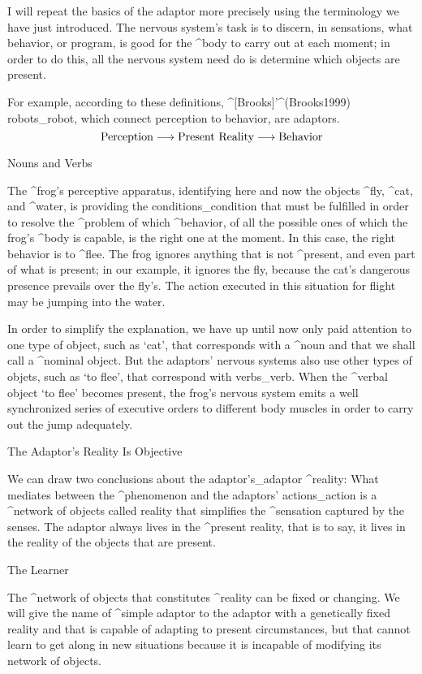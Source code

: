 I will repeat the basics of the adaptor more precisely using the
terminology we have just introduced. The nervous system's task is to
discern, in sensations, what behavior, or program, is good for the
^{body} to carry out at each moment; in order to do this, all the
nervous system need do is determine which objects are present.

For example, according to these definitions, ^[Brooks]'^(Brooks1999)
robots_{robot}, which connect perception to behavior, are adaptors.
$$\hbox{Perception} \longrightarrow \hbox{Present Reality}
   \longrightarrow \hbox{Behavior}$$


\Section Nouns and Verbs

The ^{frog}'s perceptive apparatus, identifying here and now the objects
^{fly}, ^{cat}, and ^{water}, is providing the conditions_{condition}
that must be fulfilled in order to resolve the ^{problem} of which
^{behavior}, of all the possible ones of which the frog's ^{body} is
capable, is the right one at the moment. In this case, the right
behavior is to ^{flee}. The frog ignores anything that is not
^{present}, and even part of what is present; in our example, it ignores
the fly, because the cat's dangerous presence prevails over the fly's.
The action executed in this situation for flight may be jumping into the
water.

In order to simplify the explanation, we have up until now only paid
attention to one type of object, such as `cat', that corresponds with a
^{noun} and that we shall call a ^{nominal object}. But the adaptors'
nervous systems also use other types of objets, such as `to flee', that
correspond with verbs_{verb}. When the ^{verbal object} `to flee'
becomes present, the frog's nervous system emits a well synchronized
series of executive orders to different body muscles in order to carry
out the jump adequately.


\Section The Adaptor's Reality Is Objective

We can draw two conclusions about the adaptor's_{adaptor} ^{reality}:
\beginpoints
\point What mediates between the ^{phenomenon} and the adaptors'
actions_{action} is a ^{network of objects} called reality that
simplifies the ^{sensation} captured by the senses.
\point The adaptor always lives in the ^{present} reality, that is to
say, it lives in the reality of the objects that are present.
\endpoints


\Section The Learner

The ^{network of objects} that constitutes ^{reality} can be fixed or
changing. We will give the name of ^{simple adaptor} to the adaptor with
a genetically fixed reality and that is capable of adapting to present
circumstances, but that cannot learn to get along in new situations
because it is incapable of modifying its network of objects.

